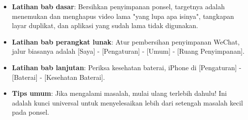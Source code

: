 
\begin{itemize}
  \item \textbf{Latihan bab dasar}: Bersihkan penyimpanan ponsel, targetnya adalah menemukan dan menghapus video lama "yang lupa apa isinya", tangkapan layar duplikat, dan aplikasi yang sudah lama tidak digunakan.
  \item \textbf{Latihan bab perangkat lunak}: Atur pembersihan penyimpanan WeChat, jalur biasanya adalah [Saya] - [Pengaturan] - [Umum] - [Ruang Penyimpanan].
  \item \textbf{Latihan bab lanjutan}: Periksa kesehatan baterai, iPhone di [Pengaturan] - [Baterai] - [Kesehatan Baterai].
  \item \textbf{Tips umum}: Jika mengalami masalah, mulai ulang terlebih dahulu! Ini adalah kunci universal untuk menyelesaikan lebih dari setengah masalah kecil pada ponsel.
\end{itemize}
